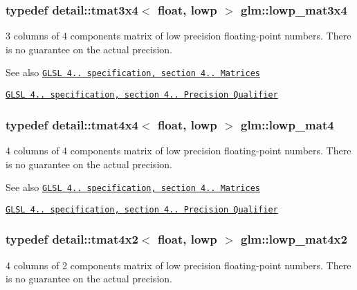\subsubsection[{\texorpdfstring{lowp\+\_\+mat3x4}{lowp_mat3x4}}]{\setlength{\rightskip}{0pt plus 5cm}typedef detail\+::tmat3x4$<$ float, lowp $>$ {\bf glm\+::lowp\+\_\+mat3x4}}\hypertarget{group__core__precision_ga9cea06e7378fe59abf95c1f56edc4320}{}\label{group__core__precision_ga9cea06e7378fe59abf95c1f56edc4320}
3 columns of 4 components matrix of low precision floating-\/point numbers. There is no guarantee on the actual precision.

\begin{DoxySeeAlso}{See also}
\href{http://www.opengl.org/registry/doc/GLSLangSpec.4.20.8.pdf}{\tt G\+L\+SL 4.. specification, section 4.. Matrices} 

\href{http://www.opengl.org/registry/doc/GLSLangSpec.4.20.8.pdf}{\tt G\+L\+SL 4.. specification, section 4.. Precision Qualifier} 
\end{DoxySeeAlso}
\subsubsection[{\texorpdfstring{lowp\+\_\+mat4}{lowp_mat4}}]{\setlength{\rightskip}{0pt plus 5cm}typedef detail\+::tmat4x4$<$ float, lowp $>$ {\bf glm\+::lowp\+\_\+mat4}}\hypertarget{group__core__precision_ga8f6fef75ce51e9d6db7971478ad1f1c2}{}\label{group__core__precision_ga8f6fef75ce51e9d6db7971478ad1f1c2}
4 columns of 4 components matrix of low precision floating-\/point numbers. There is no guarantee on the actual precision.

\begin{DoxySeeAlso}{See also}
\href{http://www.opengl.org/registry/doc/GLSLangSpec.4.20.8.pdf}{\tt G\+L\+SL 4.. specification, section 4.. Matrices} 

\href{http://www.opengl.org/registry/doc/GLSLangSpec.4.20.8.pdf}{\tt G\+L\+SL 4.. specification, section 4.. Precision Qualifier} 
\end{DoxySeeAlso}
\subsubsection[{\texorpdfstring{lowp\+\_\+mat4x2}{lowp_mat4x2}}]{\setlength{\rightskip}{0pt plus 5cm}typedef detail\+::tmat4x2$<$ float, lowp $>$ {\bf glm\+::lowp\+\_\+mat4x2}}\hypertarget{group__core__precision_ga2cfe24ae14da17f3510acfc3d03e05a5}{}\label{group__core__precision_ga2cfe24ae14da17f3510acfc3d03e05a5}
4 columns of 2 components matrix of low precision floating-\/point numbers. There is no guarantee on the actual precision.

